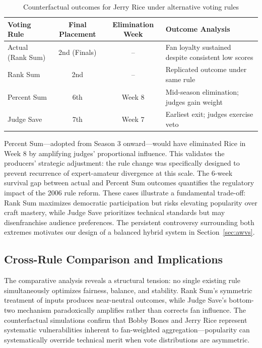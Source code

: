 \documentclass{mcmthesis}
\begin{document}
\begin{table}[H]
\centering
\caption{Counterfactual outcomes for Jerry Rice under alternative voting rules}
\begin{tabular}{l c c p{5.5cm}}
\toprule
Voting Rule & Final Placement & Elimination Week & Outcome Analysis \\
\midrule
Actual (Rank Sum) & 2nd (Finals) & -- & Fan loyalty sustained despite consistent low scores \\
Rank Sum & 2nd & -- & Replicated outcome under same rule \\
Percent Sum & 6th & Week 8 & Mid-season elimination; judges gain weight \\
Judge Save & 7th & Week 7 & Earliest exit; judges exercise veto \\
\bottomrule
\end{tabular}
\end{table}

Percent Sum---adopted from Season 3 onward---would have eliminated Rice in Week 8 by amplifying judges' proportional influence. This validates the producers' strategic adjustment: the rule change was specifically designed to prevent recurrence of expert-amateur divergence at this scale. The 6-week survival gap between actual and Percent Sum outcomes quantifies the regulatory impact of the 2006 rule reform.
These cases illustrate a fundamental trade-off: Rank Sum maximizes democratic participation but risks elevating popularity over craft mastery, while Judge Save prioritizes technical standards but may disenfranchise audience preferences. 
The persistent controversy surrounding both extremes motivates our design of a balanced hybrid system in Section~\ref{sec:awvs}.

\subsection{Cross-Rule Comparison and Implications}

The comparative analysis reveals a structural tension: no single existing rule simultaneously optimizes fairness, balance, and stability. Rank Sum's symmetric treatment of inputs produces near-neutral outcomes, while Judge Save's bottom-two mechanism paradoxically amplifies rather than corrects fan influence. The counterfactual simulations confirm that Bobby Bones and Jerry Rice represent systematic vulnerabilities inherent to fan-weighted aggregation---popularity can systematically override technical merit when vote distributions are asymmetric.
\end{document}
